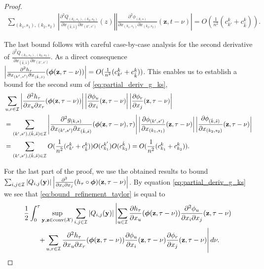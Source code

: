 \documentclass[acmsmall]{acmart}
\newcommand\by{\mathbf{y}}
\newcommand\bz{\mathbf{z}}
\newcommand\bphi{\text{\boldmath$\phi$}}
\newcommand\calX{\mathcal{X}}
\newcommand\calI{\mathcal{I}}
\newcommand\conv[1]{\mathrm{conv}(#1)}      %
\newcommand\abs[1]{\left|#1\right|}         %
\newcommand{\dd}[3]{ \frac{\partial^2 #1 }{ \partial x_{#2} \partial x_{#3}}}
\begin{document}
\begin{proof}
\begin{align*}
  \sum_{(k_1,s_1),(k_2,s_2)}  \abs{\frac{\partial^2 Q_{(k_1,s_1),(k_2,s_2)}}{\partial x_{(\hat{k},\hat{s})} \partial x_{(k',s')}}(z)} \abs{\dd{\phi_{(k,s)}}{(k_1,s_1)}{(k_2,s_2)}(\bz, t-\nu)}
  = O(\frac{1}{n^2}(c^k_{k'} + c^k_{\hat{k}})).
\end{align*}


The last bound follows with careful case-by-case analysis for the second derivative of $\frac{\partial^2 Q_{(k_1,s_1),(k_2,s_2)}}{\partial x_{(\hat{k},\hat{s})}\partial x_{(k',s')}}$. As a direct consequence $\abs{\frac{\partial^2 h_\tau}{\partial x_{(k',s')} \partial x_{(\hat{k},\hat{s})}}(\bphi (\bz, \tau-\nu))} = O(\frac{1}{n^2}(c^k_{k'} + c^k_{\hat{k}}))$. This enables us to establish a bound for the second sum of \eqref{eq:partial_deriv_g_ks},
\begin{align*}
  & \sum_{u, r \in \calI} \abs{\frac{\partial^2 h_\tau}{\partial x_u \partial x_r}(\bphi (\bz, \tau-\nu))} \abs{\frac{\partial \phi_u}{\partial x_i}(\bz,\tau-\nu)} \abs{\frac{\partial \phi_r}{\partial x_j}(\bz,\tau-\nu)} \\
  & = \sum_{(k',s'), (\hat{k},\hat{s}) \in \calI} \abs{\frac{\partial^2  g_{(k,s)}}{\partial x_{(k',s')} \partial x_{(\hat{k},\hat{s})}}(\bphi (\bz, \tau-\nu),\tau)} \abs{\frac{\partial \phi_{(k',s')}}{\partial x_{(k_1,s_1)}}(\bz,\tau-\nu)} \abs{\frac{\partial \phi_{(\hat{k},\hat{s})}}{\partial x_{(k_2,s_2)}}(\bz,\tau-\nu)} \\
  & = \sum_{(k',s'), (\hat{k},\hat{s}) \in \calI} O(\frac{1}{n^2}(c^k_{k'} + c^k_{\hat{k}}))O(c^{k'}_{k_1})O(c^{\hat{k}}_{k_2}) = O(\frac{1}{n^{2}}(c^k_{k_1} + c^k_{k_2})).
\end{align*}
\color{black}

For the last part of the proof, we use the obtained results to bound \\$\sum_{i,j\in \calI}\abs{Q_{i,j}(\by)}\abs{\frac{\partial^2}{\partial x_i \partial x_j} (h_\tau \circ \bphi)(\bz,\tau-\nu)}$. 
By equation \eqref{eq:partial_deriv_g_ks} we see that \eqref{eq:bound_refinement_taylor} is equal to 
\begin{align*}
& \frac{1}{2}\int_0^\tau \sup_{\by,\bz \in \conv{\calX}} \sum_{i,j\in \calI}\abs{Q_{i,j}(\by)} \left| \sum_{u \in \calI} \frac{\partial h_\tau}{\partial x_u}(\bphi (\bz, \tau-\nu))\frac{\partial^2 \phi_u}{\partial x_i \partial x_j}(\bz,\tau-\nu) \right. \\
&  \qquad \left. + \sum_{u, r \in \calI} \frac{\partial^2 h_\tau}{\partial x_u \partial x_r}(\bphi (\bz, \tau-\nu)) \frac{\partial \phi_u}{\partial x_i}(\bz,\tau-\nu) \frac{\partial \phi_r}{\partial x_j}(\bz,\tau-\nu) \right| d\nu.
\end{align*}


\end{proof}
\end{document}
